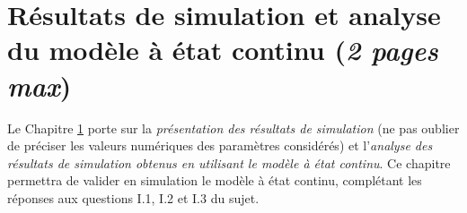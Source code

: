 \chapter{Résultats de simulation et analyse du modèle à état continu (\textit{2 pages max})}
\label{ch:simu}


Le Chapitre \ref{ch:simu} porte sur la \textit{présentation des résultats de simulation} (ne pas oublier de préciser les valeurs numériques des paramètres considérés) et l’\textit{analyse des résultats de simulation obtenus en utilisant le modèle à état continu}.
Ce chapitre permettra de valider en simulation le modèle à état continu, complétant les réponses aux questions I.1, I.2 et I.3 du sujet.
